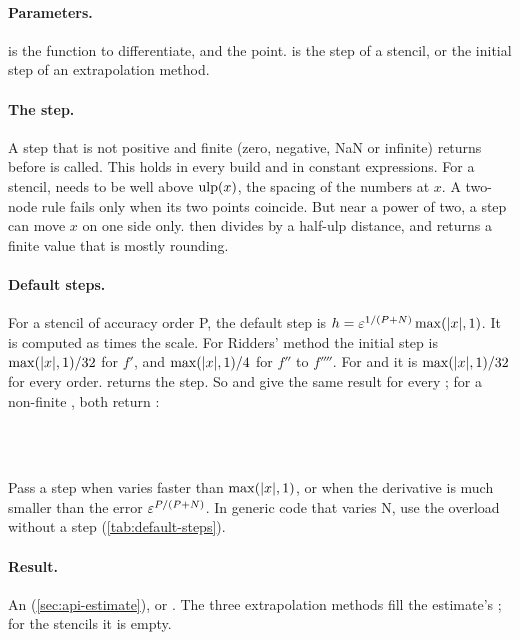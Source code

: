 \paragraph{Parameters.}  is the function to differentiate, and  the point.  is the step of a
stencil, or the initial step of an extrapolation method.

\paragraph{The step.} A step that is not positive and finite (zero, negative, NaN or infinite) returns
 before  is called. This holds in every build and in constant expressions. For a stencil,
 needs to be well above $\operatorname{ulp}(x)$, the spacing of the numbers at $x$. A two-node rule fails only when its two
points coincide. But near a power of two, a step can move $x$ on one side only.  then divides by a
half-ulp distance, and returns a finite value that is mostly rounding.

\paragraph{Default steps.} For a stencil of accuracy order P, the default step is
$h = \varepsilon^{1/(P+N)} \max(\lvert x \rvert, 1)$. It is computed as  times the scale. For
Ridders' method the initial step is $\max(\lvert x \rvert, 1)/32$ for $f'$, and $\max(\lvert x \rvert, 1)/4$ for $f''$ to $f''''$.
For  and  it is $\max(\lvert x \rvert, 1)/32$ for every order.
 returns the step. So  and
 give the same result for every ; for a non-finite
, both return :
\begin{signature}
\\
\sigindent{}\\
\end{signature}
Pass a step when  varies faster than $\max(\lvert x \rvert, 1)$, or when the derivative is much smaller than the
error $\varepsilon^{P/(P+N)}$. In generic code that varies N, use the overload without a step
(\cref{tab:default-steps}).

\paragraph{Result.} An  (\cref{sec:api-estimate}), or . The three
extrapolation methods fill the estimate's ; for the stencils it is empty.

